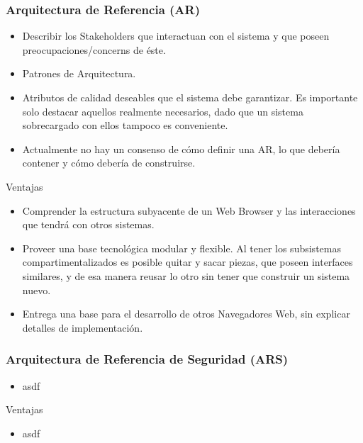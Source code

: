 \documentclass[serif,9pt]{beamer}
\begin{document}
\begin{frame}
	\frametitle{Arquitectura de Referencia (AR)}
	\begin{itemize}
		\item Describir los Stakeholders que interactuan con el sistema y que poseen preocupaciones/concerns de \'este.
		\item Patrones de Arquitectura.
		\item Atributos de calidad deseables que el sistema debe garantizar. Es importante solo destacar aquellos realmente necesarios, dado que un sistema sobrecargado con ellos tampoco es conveniente.
		\item Actualmente no hay un consenso de cómo definir una AR, lo que debería contener y cómo debería de construirse.
	\end{itemize}
	\begin{block}{Ventajas}
		\begin{itemize}
			\item Comprender la estructura subyacente de un Web Browser y las interacciones que tendr\'a con otros sistemas.
			\item Proveer una base tecnol\'ogica modular y flexible. Al tener los subsistemas compartimentalizados es posible quitar y sacar piezas, que poseen interfaces similares, y de esa manera reusar lo otro sin tener que construir un sistema nuevo.
			\item Entrega una base para el desarrollo de otros Navegadores Web, sin explicar detalles de implementaci\'on.
		\end{itemize}
	\end{block}
\end{frame}

\begin{frame}
	\frametitle{Arquitectura de Referencia de Seguridad (ARS)}
	\begin{itemize}
		\item asdf
		
	\end{itemize}
	\begin{block}{Ventajas}
		\begin{itemize}
			\item asdf
		\end{itemize}
	\end{block}
\end{frame}

\end{document}
